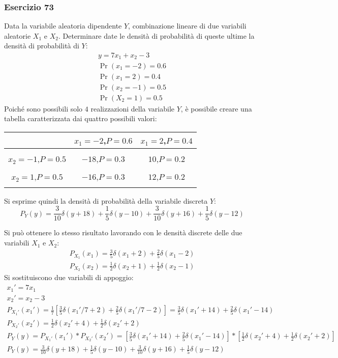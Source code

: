 \documentclass{article}
\begin{document}
\subsubsection*{Esercizio 73}

Data la variabile aleatoria dipendente $Y$, combinazione lineare di due variabili aleatorie $X_1$ e $X_2$. Determinare date le densità di probabilità 
di queste ultime la densità di probabilità di $Y$:
\begin{gather*}
    y=7x_1+x_2-3\\
    \Pr(x_1=-2)=0.6\\
    \Pr(x_1=2)=0.4\\
    \Pr(x_2=-1)=0.5\\
    \Pr(X_2=1)=0.5
\end{gather*}
Poiché sono possibili solo $4$ realizzazioni della variabile $Y$, è possibile creare una tabella caratterizzata dai quattro possibili valori:
\begin{center}
    \begin{tabular}{c|c|c|}
        &$x_1=-2$,$P=0.6$&$x_1=2$,$P=0.4$\\
        \hline\\
        $x_2=-1$,$P=0.5$&$-18$,$P=0.3$&$10$,$P=0.2$\\
        \hline\\
        $x_2=1$,$P=0.5$ &$-16$,$P=0.3$ &$12$,$P=0.2$\\
        \hline\\
    \end{tabular}
\end{center}
Si esprime quindi la densità di probabilità della variabile discreta $Y$:
\begin{equation}
    P_Y(y)=\displaystyle\frac{3}{10}\delta(y+18)+\frac{1}{5}\delta(y-10)+\frac{3}{10}\delta(y+16)+\frac{1}{5}\delta(y-12)
\end{equation}

Si può ottenere lo stesso risultato lavorando con le densità discrete delle due variabili $X_1$ e $X_2$:
\begin{gather*}
    P_{X_1}(x_1)=\displaystyle\frac{3}{5}\delta(x_1+2)+\frac{2}{5}\delta(x_1-2)\\
    P_{X_2}(x_2)=\displaystyle\frac{1}{2}\delta(x_2+1)+\frac{1}{2}\delta(x_2-1)
\end{gather*}
Si sostituiscono due variabili di appoggio:
\begin{gather*}
    x_1'=7x_1\\
    x_2'=x_2-3\\
    P_{X_1'}(x_1')=\displaystyle\frac{1}{7}\left[\frac{3}{5}\delta(x_1'/7+2)+\frac{2}{5}\delta(x_1'/7-2)\right]=\frac{3}{5}\delta(x_1'+14)+\frac{2}{5}\delta(x_1'-14)\\
    P_{X_2'}(x_2')=\displaystyle\frac{1}{2}\delta(x_2'+4)+\frac{1}{2}\delta(x_2'+2)\\
    P_Y(y)=P_{X_1'}(x_1')*P_{X_2'}(x_2')=\left[\displaystyle\frac{3}{5}\delta(x_1'+14)+\frac{2}{5}\delta(x_1'-14)\right]*\left[\frac{1}{2}\delta(x_2'+4)+\frac{1}{2}\delta(x_2'+2)\right]\\
    P_Y(y)=\displaystyle\frac{3}{10}\delta(y+18)+\frac{1}{5}\delta(y-10)+\frac{3}{10}\delta(y+16)+\frac{1}{5}\delta(y-12)
\end{gather*}
\end{document}
